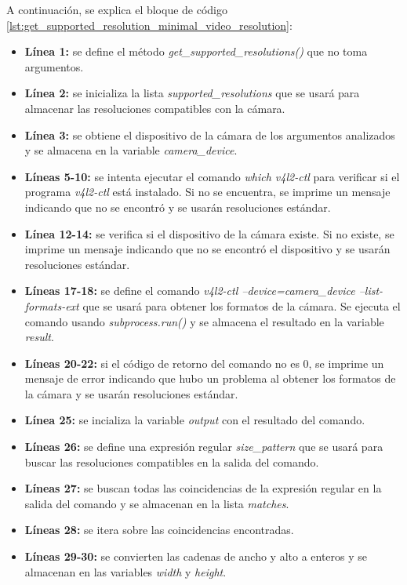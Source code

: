 A continuación, se explica el bloque de código \ref{lst:get_supported_resolution_minimal_video_resolution}:
\begin{itemize}
    \item \textbf{Línea 1:} se define el método \textit{get\_supported\_resolutions()} que no toma argumentos.
    \item \textbf{Línea 2:} se inicializa la lista \textit{supported\_resolutions} que se usará para almacenar las resoluciones compatibles con la cámara.
    \item \textbf{Línea 3:} se obtiene el dispositivo de la cámara de los argumentos analizados y se almacena en la variable \textit{camera\_device}.
    \item \textbf{Líneas 5-10:} se intenta ejecutar el comando \textit{which v4l2-ctl} para verificar si el programa \textit{v4l2-ctl} está instalado. Si no se encuentra, se imprime un mensaje indicando que no se encontró y se usarán resoluciones estándar.
    \item \textbf{Línea 12-14:} se verifica si el dispositivo de la cámara existe. Si no existe, se imprime un mensaje indicando que no se encontró el dispositivo y se usarán resoluciones estándar.
    \item \textbf{Líneas 17-18:} se define el comando \textit{v4l2-ctl --device=camera\_device --list-formats-ext} que se usará para obtener los formatos de la cámara. Se ejecuta el comando usando \textit{subprocess.run()} y se almacena el resultado en la variable \textit{result}.
    \item \textbf{Líneas 20-22:} si el código de retorno del comando no es 0, se imprime un mensaje de error indicando que hubo un problema al obtener los formatos de la cámara y se usarán resoluciones estándar.
    \item \textbf{Línea 25:} se incializa la variable \textit{output} con el resultado del comando.
    \item \textbf{Líneas 26:} se define una expresión regular \textit{size\_pattern} que se usará para buscar las resoluciones compatibles en la salida del comando.
    \item \textbf{Líneas 27:} se buscan todas las coincidencias de la expresión regular en la salida del comando y se almacenan en la lista \textit{matches}.
    \item \textbf{Líneas 28:} se itera sobre las coincidencias encontradas.
    \item \textbf{Líneas 29-30:} se convierten las cadenas de ancho y alto a enteros y se almacenan en las variables \textit{width} y \textit{height}.

\end{itemize}
